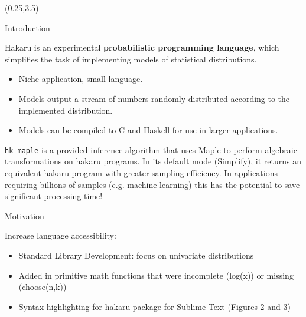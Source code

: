 \documentclass[22pt]{beamer}
\begin{document}
\begin{frame}[fragile]
\begin{textblock}{5}(0.25,3.5)


\begin{block}{\Large{Introduction}}
\justifying

\footnotesize{Hakaru is an experimental \textbf{probabilistic programming language}, which simplifies the task of implementing models of statistical distributions.

\begin{itemize}
    \item Niche application, small language.
    \item Models output a stream of numbers randomly distributed according to the implemented distribution.
    \item Models can be compiled to C and Haskell for use in larger applications.
\end{itemize}

}

\bigskip
\footnotesize{{\tt \footnotesize{hk-maple}} is a provided inference algorithm that uses Maple to perform algebraic transformations on hakaru programs. In its default mode (Simplify), it returns an equivalent hakaru program with greater sampling efficiency. In applications requiring billions of samples (e.g. machine learning) this has the potential to save significant processing time!}

\end{block}


\begin{block}{\Large{Motivation}}
\justifying

\bigskip
\footnotesize{Increase language accessibility:
\begin{itemize}
  \item Standard Library Development: focus on univariate distributions
  \item Added in primitive math functions that were incomplete (log(x)) or missing (choose(n,k)) 
  \item Syntax-highlighting-for-hakaru package for Sublime Text (Figures 2 and 3)
\end{itemize}
}


\end{block}
\end{textblock}
\end{frame}
\end{document}
